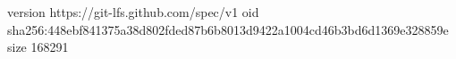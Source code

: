 version https://git-lfs.github.com/spec/v1
oid sha256:448ebf841375a38d802fded87b6b8013d9422a1004cd46b3bd6d1369e328859e
size 168291
